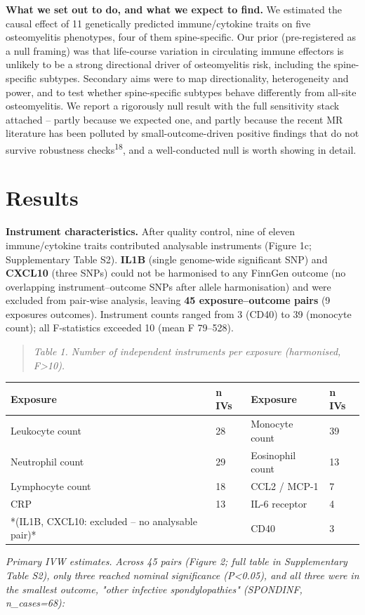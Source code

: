 \documentclass[11pt]{article}
\begin{document}
\textbf{What we set out to do, and what we expect to find.} We estimated the causal effect of 11 genetically predicted immune/cytokine traits on five osteomyelitis phenotypes, four of them spine-specific. Our prior (pre-registered as a null framing) was that life-course variation in circulating immune effectors is unlikely to be a strong directional driver of osteomyelitis risk, including the spine-specific subtypes. Secondary aims were to map directionality, heterogeneity and power, and to test whether spine-specific subtypes behave differently from all-site osteomyelitis. We report a rigorously null result with the full sensitivity stack attached -- partly because we expected one, and partly because the recent MR literature has been polluted by small-outcome-driven positive findings that do not survive robustness checks\textsuperscript{18}, and a well-conducted null is worth showing in detail.

\section{Results}
\textbf{Instrument characteristics.} After quality control, nine of eleven immune/cytokine traits contributed analysable instruments (Figure 1c; Supplementary Table S2). \textbf{IL1B} (single genome-wide significant SNP) and \textbf{CXCL10} (three SNPs) could not be harmonised to any FinnGen outcome (no overlapping instrument--outcome SNPs after allele harmonisation) and were excluded from pair-wise analysis, leaving \textbf{45 exposure--outcome pairs} (9 exposures  outcomes). Instrument counts ranged from 3 (CD40) to 39 (monocyte count); all F-statistics exceeded 10 (mean F 79--528).

\begin{quote}\emph{Table 1. Number of independent instruments per exposure (harmonised, F>10).}\end{quote}
\begin{table}[ht]\centering
\begin{tabular}{llll}
\toprule
Exposure & n IVs & Exposure & n IVs \\
\midrule
Leukocyte count & 28 & Monocyte count & 39 \\
Neutrophil count & 29 & Eosinophil count & 13 \\
Lymphocyte count & 18 & CCL2 / MCP-1 & 7 \\
CRP & 13 & IL-6 receptor & 4 \\
*(IL1B, CXCL10: excluded -- no analysable pair)* &  & CD40 & 3 \\
\bottomrule
\end{tabular}
\end{table}
\emph{Primary IVW estimates.}\emph{ Across 45 pairs (Figure 2; full table in Supplementary Table S2), }\emph{only three reached nominal significance (P<0.05), and all three were in the smallest outcome, "other infective spondylopathies" (SPONDINF, n\_cases=68):}
\end{document}
